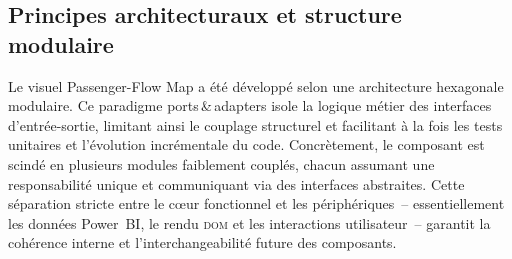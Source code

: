 \subsection{Principes architecturaux et structure modulaire}
\label{subsec:4A-principes-structure}

\setlength{\parindent}{0pt}

Le visuel Passenger\nobreakdash-Flow Map a été développé selon une architecture hexagonale modulaire. Ce paradigme \og ports\,\&\,adapters\fg{} isole la logique métier des interfaces d’entrée-sortie, limitant ainsi le couplage structurel et facilitant à la fois les tests unitaires et l’évolution incrémentale du code. Concrètement, le composant est scindé en plusieurs modules faiblement couplés, chacun assumant une responsabilité unique et communiquant via des interfaces abstraites. Cette séparation stricte entre le cœur fonctionnel et les périphériques – essentiellement les données Power BI, le rendu \textsc{dom} et les interactions utilisateur – garantit la cohérence interne et l’interchangeabilité future des composants.

